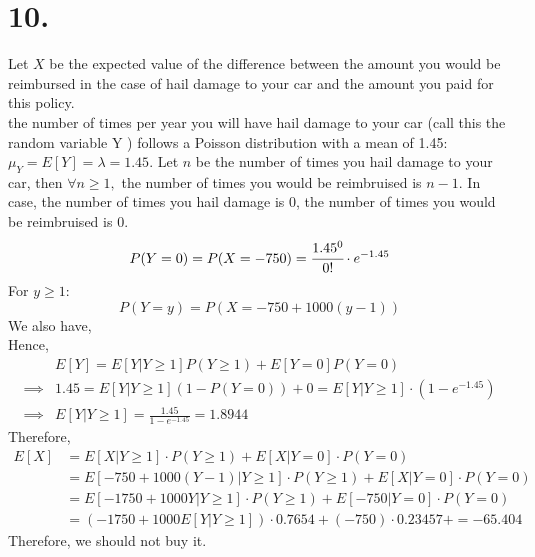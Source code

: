 \documentclass[11pt]{article}
\begin{document}
\section*{10.}
Let $X$ be the expected value of the difference between the amount you would be reimbursed in the case of hail damage to your car and the amount you paid for this policy.\\
the number of times per year you will have hail damage to your car (call this the random variable Y ) follows a Poisson distribution with a mean of 1.45: 
$\mu_Y = E[Y] = \lambda = 1.45$. Let $n$ be the number of times you hail damage to your car, then $\forall n \ge 1,$ the number of times you would be reimbruised is $n-1$. In case, the number of times you hail damage is 0, the number of times you would be reimbruised is $0$. \\ 
\[P(Y=0) = P(X=-750) = \cfrac{1.45^0}{0!} \cdot e^{-1.45}\]
For $y\ge 1$:
\[
P(Y=y) = P(X = -750+1000(y-1)) 
\]
We also have,
\[ 
\]
Hence,
\begin{equation*}
\begin{aligned}
&E[Y] = E[Y|Y\ge 1] P(Y\ge 1) + E[Y=0] P(Y=0) \\
\implies & 1.45 = E[Y| Y\ge 1](1-P(Y=0)) + 0 = E[Y|Y\ge 1] \cdot (1- e^{-1.45})\\
\implies & E[Y|Y\ge 1] = \frac{1.45}{1-e^{-1.45}} = 1.8944
\end{aligned}
\end{equation*}
Therefore,
\begin{equation*}
\begin{aligned}
E[X] &= E[X|Y\ge 1] \cdot P(Y\ge 1) + E[X|Y=0] \cdot P(Y=0) \\
&= E[-750+1000(Y-1) | Y \ge 1] \cdot P(Y\ge 1) + E[X|Y=0] \cdot P(Y=0) \\
&= E[-1750+1000Y|Y \ge 1]  \cdot P(Y\ge 1) + E[-750|Y=0] \cdot P(Y=0)\\
&= (-1750 + 1000E[Y| Y \ge 1]) \cdot 0.7654 + (-750) \cdot 0.23457 + = -65.404
\end{aligned}
\end{equation*}
Therefore, we should not buy it.
\pagebreak
\end{document}
